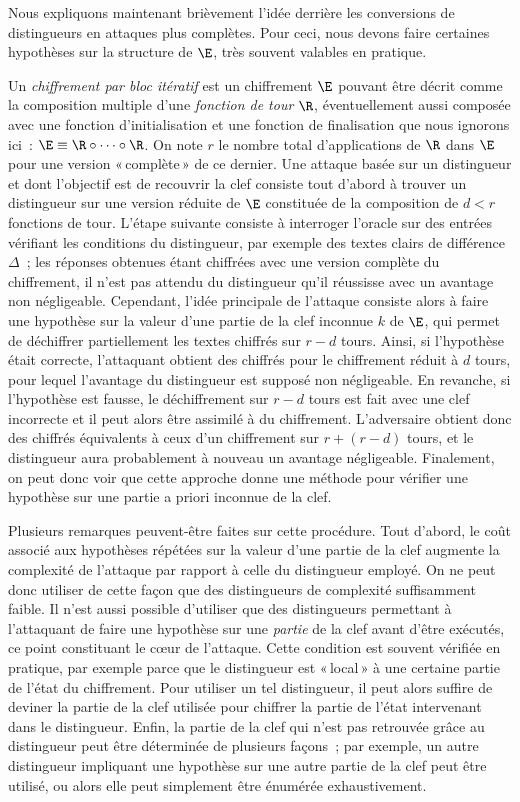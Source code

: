 \medskip

Nous expliquons maintenant brièvement l'idée derrière les conversions de distingueurs en attaques plus complètes. Pour ceci, nous devons faire
certaines hypothèses sur la structure de $\E$, très souvent valables en pratique.

Un  \emph{chiffrement par bloc itératif} est un chiffrement $\E$ pouvant être décrit comme la composition multiple
d'une \emph{fonction de tour} $\R$, éventuellement aussi composée avec une fonction d'initialisation et une fonction de finalisation
que nous ignorons ici~:
$\E \equiv \R \circ \cdots \circ \R$. On note $r$ le nombre total d'applications de $\R$ dans $\E$ pour une version «\,complète\,» de ce dernier.
Une attaque basée sur un distingueur et dont l'objectif est de recouvrir la clef consiste tout d'abord à trouver un distingueur sur une version
réduite de $\E$ constituée de la composition de $d < r$ fonctions de tour. L'étape suivante consiste à interroger l'oracle sur
des entrées vérifiant les conditions du distingueur, par exemple des textes clairs de différence $\Delta$~; les réponses obtenues étant chiffrées
avec une version complète du chiffrement, il n'est pas attendu du distingueur qu'il réussisse avec un avantage non négligeable.
Cependant, l'idée principale de l'attaque consiste alors à faire
une hypothèse sur la valeur d'une partie de la clef inconnue $k$ de $\E$,
qui permet de déchiffrer partiellement les textes chiffrés sur $r-d$ tours. Ainsi, si l'hypothèse était correcte, l'attaquant obtient des chiffrés pour le
chiffrement réduit à $d$ tours, pour lequel l'avantage du distingueur est supposé non négligeable.
En revanche, si l'hypothèse est fausse,
le déchiffrement sur $r-d$ tours est fait avec une clef incorrecte et il peut alors être assimilé à du chiffrement. L'adversaire obtient donc
des chiffrés équivalents à ceux d'un chiffrement sur $r + (r - d)$ tours, et le distingueur aura probablement à nouveau un avantage négligeable.
Finalement, on peut donc
voir que cette approche donne une méthode pour vérifier une hypothèse sur une partie a priori inconnue de la clef.

Plusieurs remarques peuvent-être faites sur cette procédure. Tout d'abord, le coût associé aux hypothèses répétées sur la valeur d'une partie de la clef
augmente la complexité de l'attaque par rapport à celle du distingueur employé. On ne peut donc utiliser de cette façon que
des distingueurs de complexité suffisamment faible.
Il n'est aussi possible d'utiliser que des distingueurs permettant à l'attaquant de faire une hypothèse sur une \emph{partie} de la clef avant
d'être exécutés, ce point constituant 
le c\oe ur de l'attaque. Cette condition est souvent vérifiée en pratique, par exemple parce que le distingueur est «\,local\,»
à une certaine partie de l'état du chiffrement. Pour utiliser un tel distingueur, il peut alors suffire de deviner la partie de la clef
utilisée pour chiffrer la partie de l'état intervenant dans le distingueur.
Enfin, la partie de la clef qui n'est pas retrouvée grâce au distingueur peut être déterminée de plusieurs façons~; par exemple, un autre distingueur
impliquant une hypothèse sur une autre partie de la clef peut être utilisé, ou alors elle peut simplement être énumérée exhaustivement.


